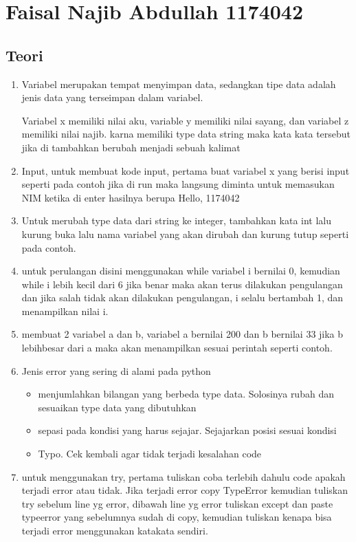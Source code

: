\section{Faisal Najib Abdullah 1174042}
\subsection{Teori}
\begin{enumerate}
	\item Variabel merupakan tempat menyimpan data, sedangkan tipe data adalah jenis data yang terseimpan dalam variabel.
	
	Variabel x memiliki nilai aku, variable y memiliki nilai sayang, dan variabel z memiliki nilai najib. karna memiliki type data string maka kata kata tersebut jika di tambahkan berubah menjadi sebuah kalimat
	
	\item Input, untuk membuat kode input, pertama buat variabel x yang berisi input seperti pada contoh jika di run maka langsung diminta untuk memasukan NIM ketika di enter hasilnya berupa Hello, 1174042
	
	
	\item Untuk merubah type data dari string ke integer, tambahkan kata int lalu kurung buka lalu nama variabel yang akan dirubah dan kurung tutup seperti pada contoh.
	
	
	\item untuk perulangan disini menggunakan while variabel i bernilai 0, kemudian while i lebih kecil dari 6 jika benar maka akan terus dilakukan pengulangan dan jika salah tidak akan dilakukan pengulangan, i selalu bertambah 1, dan menampilkan nilai i. 
	
	
	\item membuat 2 variabel a dan b, variabel a bernilai 200 dan b bernilai 33 jika b lebihbesar dari a maka akan menampilkan sesuai perintah seperti contoh.
	
	
	\item Jenis error yang sering di alami pada python
	\begin{itemize}
	    \item menjumlahkan bilangan yang berbeda type data. Solosinya rubah dan sesuaikan type data yang dibutuhkan
	    \item sepasi pada kondisi yang harus sejajar. Sejajarkan posisi sesuai kondisi
	    \item Typo. Cek kembali agar tidak terjadi kesalahan code
	\end{itemize}
	
	\item untuk menggunakan try, pertama tuliskan coba terlebih dahulu code apakah terjadi error atau tidak. Jika terjadi error copy TypeError kemudian tuliskan try sebelum line yg error, dibawah line yg error tuliskan except dan paste typeerror yang sebelumnya sudah di copy, kemudian tuliskan kenapa bisa terjadi error menggunakan katakata sendiri.
	
\end{enumerate}

